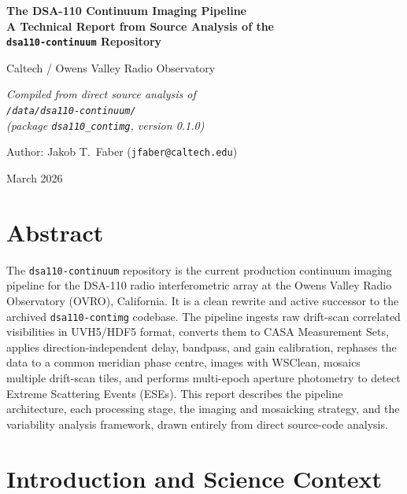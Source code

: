 \documentclass[12pt,a4paper]{article}
\begin{document}
\begin{titlepage}
  \centering
  \vspace*{3cm}
  {\LARGE\bfseries The DSA-110 Continuum Imaging Pipeline\\[0.4em]
   A Technical Report from Source Analysis of the\\[0.2em]
   \texttt{dsa110-continuum} Repository\par}
  \vspace{1.5cm}
  {\large Caltech / Owens Valley Radio Observatory\par}
  \vspace{1.2cm}
  {\normalsize\itshape
   Compiled from direct source analysis of\\
   \texttt{/data/dsa110-continuum/}\\
   (package \texttt{dsa110\_contimg}, version 0.1.0)\par}
  \vspace{0.6cm}
  {\normalsize Author: Jakob T.\ Faber (\texttt{jfaber@caltech.edu})\par}
  \vfill
  {\normalsize March 2026}
\end{titlepage}

\section*{Abstract}

The \texttt{dsa110-continuum} repository is the current production continuum
imaging pipeline for the DSA-110 radio interferometric array at the Owens
Valley Radio Observatory (OVRO), California.  It is a clean rewrite and
active successor to the archived \texttt{dsa110-contimg} codebase.  The
pipeline ingests raw drift-scan correlated visibilities in UVH5/HDF5 format,
converts them to CASA Measurement Sets, applies direction-independent delay,
bandpass, and gain calibration, rephases the data to a common meridian phase
centre, images with WSClean, mosaics multiple drift-scan tiles, and performs
multi-epoch aperture photometry to detect Extreme Scattering Events (ESEs).
This report describes the pipeline architecture, each processing stage,
the imaging and mosaicking strategy, and the variability analysis framework,
drawn entirely from direct source-code analysis.

\section{Introduction and Science Context}
\end{document}
